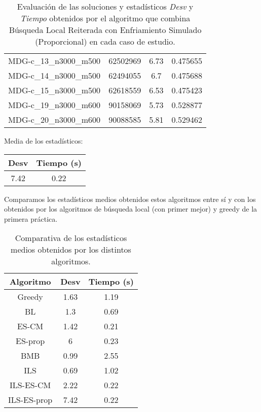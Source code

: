 \documentclass{article}
\begin{document}
\begin{table}[H]
\begin{tabular}{|cccc|}
		MDG-c\_13\_n3000\_m500 & 62502969 & 6.73 & 0.475655\\
		MDG-c\_14\_n3000\_m500 & 62494055 & 6.7 & 0.475688\\
		MDG-c\_15\_n3000\_m500 & 62618559 & 6.53 & 0.475423\\
		MDG-c\_19\_n3000\_m600 & 90158069 & 5.73 & 0.528877\\
		MDG-c\_20\_n3000\_m600 & 90088585 & 5.81 & 0.529462\\
		\hline
	\end{tabular}
	\caption{Evaluación de las soluciones y estadísticos \emph{Desv} y \emph{Tiempo} obtenidos por el algoritmo que combina
		Búsqueda Local Reiterada con Enfriamiento Simulado (Proporcional) en cada caso de estudio.}
	\label{tab:ils-es-proporcional}
\end{table}

Media de los estadísticos:
\begin{table}[H]
	\centering
	\begin{tabular}{|cc|}
		\hline
		Desv & Tiempo (s)\\ \hline
		7.42 & 0.22 \\
		\hline
	\end{tabular}
\end{table}

\pagebreak

Comparamos los estadísticos medios obtenidos estos algoritmos entre sí y con los obtenidos por los algoritmos
de búsqueda local (con primer mejor) y greedy de la primera práctica.

\begin{table}[H]
	\centering
	\begin{tabular}{|ccc|}
		\hline
		Algoritmo & Desv & Tiempo (s)\\ \hline
		Greedy & 1.63 & 1.19 \\
		BL & 1.3 & 0.69 \\
		ES-CM & 1.42 & 0.21 \\
		ES-prop & 6 & 0.23 \\
		BMB & 0.99 & 2.55 \\
		ILS & 0.69 & 1.02 \\
		ILS-ES-CM & 2.22 & 0.22 \\
		ILS-ES-prop & 7.42 & 0.22 \\
		\hline
	\end{tabular}
	\caption{Comparativa de los estadísticos medios obtenidos por los distintos algoritmos.}
	\label{tab:comparativa}
\end{table}
\end{document}
